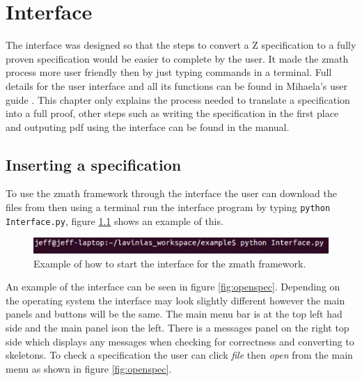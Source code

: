 \chapter{Interface}
\label{ch:interface}

The interface was designed so that the steps to convert a Z specification to a fully proven specification would be easier to complete by the user. It made the \gls{zmath} process more user friendly then by just typing commands in a terminal. Full details for the user interface and all its functions can be found in Mihaela's user guide . This chapter only explains the process needed to translate a specification into a full proof, other steps such as writing the specification in the first place and outputing pdf using the interface can be found in the manual.

\section{Inserting a specification}
To use the \gls{zmath} framework through the interface the user can download the files from \cite{zmathweb} then using a terminal run the interface program by typing \newline \verb|python Interface.py|, figure \ref{fig:startinterface} shows an example of this.

\begin{figure}[H]
\includegraphics[scale=0.6]{Figures/Interface/startinterface.png}
\caption{Example of how to start the interface for the \gls{zmath} framework. \label{fig:startinterface}}
\end{figure}

An example of the interface can be seen in figure \ref{fig:openspec}. Depending on the operating system the interface may look slightly different however the main panels and buttons will be the same. The main menu bar is at the top left had side and the main panel ison the left. There is a messages panel on the right top side which displays any messages when checking for correctness and converting to skeletons. To check a specification the user can click \emph{file} then \emph{open} from the main menu as shown in figure \ref{fig:openspec}.

